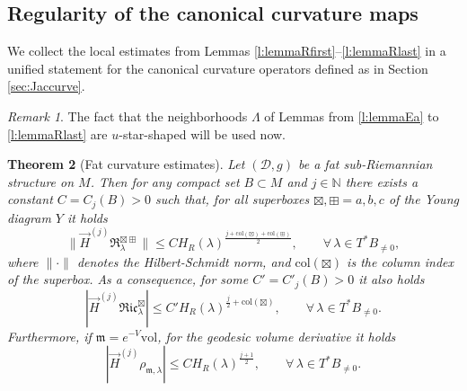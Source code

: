 \documentclass[11pt,a4paper]{article}
\theoremstyle{plain}
\newtheorem{theorem}{Theorem}[section]
\theoremstyle{definition}
\theoremstyle{remark}
\newtheorem{remark}[theorem]{Remark}
\numberwithin{equation}{section}
\newcommand{\N}{\mathbb{N}} %
\newcommand{\col}{\mathrm{col}}
\newcommand{\distr}{\mathscr{D}}
\newcommand{\mm}{\mathfrak m}
\begin{document}
\subsection{Regularity of the canonical curvature maps}

We collect the local estimates from Lemmas \ref{l:lemmaRfirst}--\ref{l:lemmaRlast} in a unified statement for the canonical curvature operators defined as in Section \ref{sec:Jaccurve}.

\begin{remark}
The fact that the neighborhoods $\Lambda$ of Lemmas from \ref{l:lemmaEa} to \ref{l:lemmaRlast} are $u$-star-shaped will be used now.
\end{remark}
\begin{theorem}[Fat curvature estimates]\label{t:fatcurvbound}
Let $(\distr,g)$ be a fat sub-Riemannian structure on $M$. Then for any compact set $B\subset M$ and $j\in \N$ there exists a constant $C=C_j(B)>0$ such that, for all superboxes $\boxtimes,\boxplus =a,b,c$ of the Young diagram $Y$ it holds
\begin{equation}
\|\vec{H}^{(j)}\mathfrak{R}_{\lambda}^{\boxtimes\boxplus}\| \leq C H_R(\lambda)^{\tfrac{j+\col(\boxtimes)+\col(\boxplus)}{2}}, \qquad \forall\, \lambda \in T^*B_{\neq 0},
\end{equation}
where $\|\cdot\|$ denotes the Hilbert-Schmidt norm, and $\col(\boxtimes)$ is the column index of the superbox. As a consequence, for some $C'= C'_j(B)>0$ it also holds
\begin{equation}
|\vec{H}^{(j)}\mathfrak{Ric}_{\lambda}^{\boxtimes}| \leq C' H_R(\lambda)^{\tfrac{j}{2}+\col(\boxtimes)}, \qquad \forall\, \lambda \in T^*B_{\neq 0}.
\end{equation}
Furthermore, if $\mm = e^{-V}\mathrm{vol}$, for the geodesic volume derivative it holds
\begin{equation}
|\vec{H}^{(j)}\rho_{\mm,\lambda}| \leq C H_R(\lambda)^{\tfrac{j+1}{2}}, \qquad \forall\, \lambda \in T^*B_{\neq 0}.
\end{equation}
\end{theorem}
\end{document}
